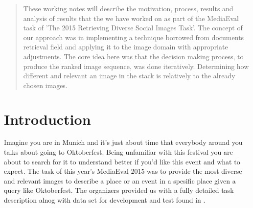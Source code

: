 \documentclass{sig-alternate}
\begin{document}
{\date{20 Agoust 2015}

\maketitle
\begin{abstract}
These working notes will describe the motivation, process, results and 
analysis of results that the we have worked on as part of the 
MediaEval task of 'The 2015 Retrieving Diverse Social Images Task'. 
The concept of our approach was in implementing a technique \cite{fscore} borrowed from documents retrieval field 
and applying it to the image domain with appropriate adjustments. 
The core idea here was that the decision making process, to produce the ranked image sequence, 
was done iteratively. Determining how different and relevant an image in 
the stack is relatively to the already chosen images. 

\end{abstract}


\section{Introduction}
Imagine you are in Munich and it's just about time that everybody around you talks about going to 
Oktoberfest. Being unfamiliar with this festival you are about to search for it to understand better if 
you'd like this event and what to expect. The task of this year's MediaEval 2015 was to provide the most
diverse and relevant images to describe a place or an event in a spesific place given a query like Oktoberfest.
The organizers provided us with a fully detailed task description alnog with data set for development and test 
found in \cite{mediaEval2015}.


}
\end{document}
